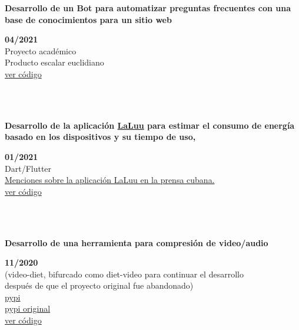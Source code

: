 \documentclass{article}
\begin{document}
    \begin{minipage}{0.8\textwidth}
    \parbox{0.8\linewidth}{\textbf{Desarrollo de un Bot para automatizar preguntas frecuentes con una base de conocimientos para un sitio web}} \hfill \textbf{04/2021}\\
    Proyecto académico\\
    Producto escalar euclidiano\\
    \href{https://github.com/JavierOramas/FAQ-Chat-Bot-Nous}{ver código}\\
    \end{minipage} \hfill {}\\\\
    \begin{minipage}{0.8\textwidth}
    \parbox{0.8\linewidth}{\textbf{Desarrollo de la aplicación \hyperref[sec:laluu]{LaLuu} para estimar el consumo de energía basado en los dispositivos y su tiempo de uso,}} \hfill \textbf{01/2021}\\
    Dart/Flutter\\
    \hyperref[sec:laluu_press]{Menciones sobre la aplicación LaLuu en la prensa cubana.}\\
    \href{https://github.com/geeksLabTech/LaLuu}{ver código}\\
    \end{minipage} \hfill {}\\\\
    \begin{minipage}{0.8\textwidth}
    \parbox{0.8\linewidth}{\textbf{Desarrollo de una herramienta para compresión de video/audio}} \hfill \textbf{11/2020}\\
    (video-diet, bifurcado como diet-video para continuar el desarrollo \\
    después de que el proyecto original fue abandonado)\\
    \href{https://pypi.org/project/diet-video/}{pypi}\\
    \href{https://pypi.org/project/video-diet/}{pypi original}\\
    \href{https://github.com/JavierOramas/video-diet}{ver código}\\
    \end{minipage} \hfill {}\\\\
\end{document}

